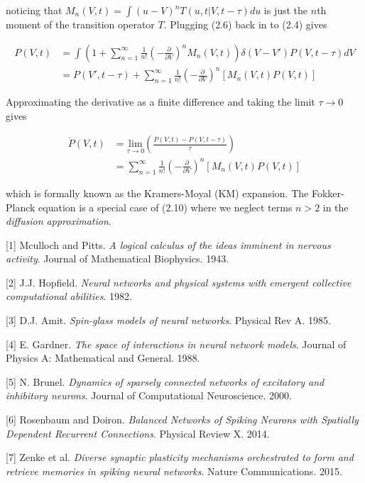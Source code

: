 \documentclass{ucetd}
\begin{document}
\begin{appendices}
noticing that $M_{n}(V,t) = \int(u-V)^{n}T(u, t | V, t-\tau)du$ is just the $n$th moment of the transition operator $T$. Plugging (2.6) back in to (2.4) gives 

\begin{align}
P(V, t) &= \int \left(1 + \sum_{n=1}^{\infty} \frac{1}{n!}\left(-\frac{\partial}{\partial V}\right)^{n} M_{n}(V,t)\right)\delta(V-V')P(V, t-\tau)dV\\
&= P(V', t-\tau) + \sum_{n=1}^{\infty} \frac{1}{n!}\left(-\frac{\partial}{\partial V}\right)^{n} \left[M_{n}(V,t)P(V,t)\right]
\end{align} 

Approximating the derivative as a finite difference and taking the limit $\tau\rightarrow 0$ gives

\begin{align}
\dot{P}(V,t)  &= \underset{\tau\rightarrow 0}{\mathrm{lim}}\left(\frac{P(V, t)-P(V, t-\tau)}{\tau}\right)\\
&= \sum_{n=1}^{\infty} \frac{1}{n!}\left(-\frac{\partial}{\partial V}\right)^{n} \left[M_{n}(V,t)P(V,t)\right]
\end{align} 

which is formally known as the Kramers-Moyal (KM) expansion. The Fokker-Planck equation is a special case of (2.10) where we neglect terms $n>2$ in the \emph{diffusion approximation}.
\end{appendices}

\makebibliography

[1] Mculloch and Pitts. \textit{A logical calculus of the ideas imminent in nervous activity}. Journal of Mathematical Biophysics. 1943.

[2] J.J. Hopfield. \textit{Neural networks and physical systems with emergent collective computational abilities}. 1982.

[3] D.J. Amit. \textit{Spin-glass models of neural networks}. Physical Rev A. 1985.

[4] E. Gardner. \textit{The space of interactions in neural network models}. Journal of Physics A: Mathematical and General. 1988.

[5] N. Brunel. \textit{Dynamics of sparsely connected networks of excitatory and inhibitory neurons}. Journal of Computational Neuroscience. 2000. 

[6] Rosenbaum and Doiron. \textit{Balanced Networks of Spiking Neurons with Spatially Dependent Recurrent Connections}. Physical Review X. 2014.

[7] Zenke et al. \textit{Diverse synaptic plasticity mechanisms
orchestrated to form and retrieve memories
in spiking neural networks}. Nature Communications. 2015.
\end{document}
